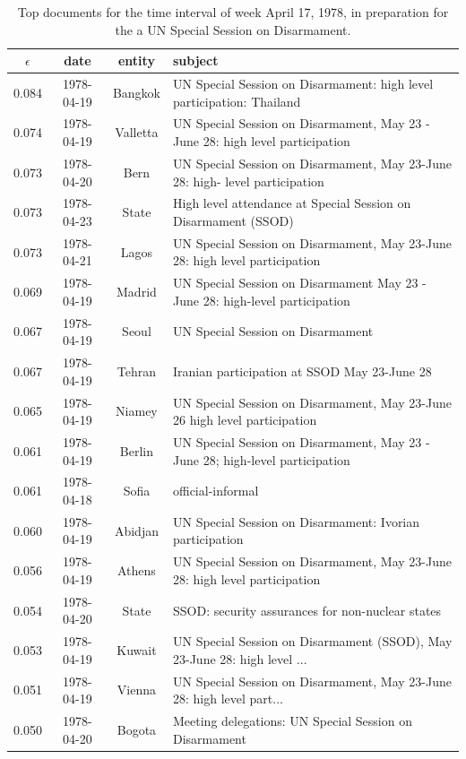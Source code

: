 \begin{table}[tb]
\small
\centering
\begin{tabular}{cccl}
\toprule
$\epsilon$ & date & entity & subject \\
\midrule
0.084 & 1978-04-19 & Bangkok & UN Special Session on Disarmament: high level participation: Thailand \\
0.074 & 1978-04-19 & Valletta & UN Special Session on Disarmament, May 23 - June 28: high level  participation \\
0.073 & 1978-04-20 & Bern & UN Special Session on Disarmament, May 23-June 28: high- level  participation \\
0.073 & 1978-04-23 & State & High level attendance at Special Session on Disarmament (SSOD) \\
0.073 & 1978-04-21 & Lagos & UN Special Session on Disarmament, May 23-June 28: high level  participation \\
0.069 & 1978-04-19 & Madrid & UN Special Session on Disarmament May 23 - June 28: high-level  participation \\
0.067 & 1978-04-19 & Seoul & UN Special Session on Disarmament \\
0.067 & 1978-04-19 & Tehran & Iranian participation at SSOD May 23-June 28 \\
0.065 & 1978-04-19 & Niamey & UN Special Session on Disarmament, May 23-June 26 high level participation \\
0.061 & 1978-04-19 & Berlin & UN Special Session on Disarmament, May 23 - June 28; high-level participation \\
0.061 & 1978-04-18 & Sofia & official-informal \\
0.060 & 1978-04-19 & Abidjan & UN Special Session on Disarmament: Ivorian participation \\
0.056 & 1978-04-19 & Athens & UN Special Session on Disarmament, May 23-June 28: high level participation \\
0.054 & 1978-04-20 & State & SSOD: security assurances for non-nuclear states \\
0.053 & 1978-04-19 & Kuwait & UN Special Session on Disarmament (SSOD), May 23-June 28: high level ... \\%
0.051 & 1978-04-19 & Vienna & UN Special Session on Disarmament, May 23-June 28: high level part... \\%
0.050 & 1978-04-20 & Bogota & Meeting delegations: UN Special Session on Disarmament \\
\bottomrule
\end{tabular}
\label{tab:ssod}
\caption{Top documents for the time interval of week April 17, 1978, in preparation for the a UN Special Session on Disarmament.}
\end{table}

